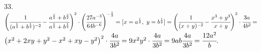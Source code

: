 33. $\left(\cfrac{1}{(a^\frac{1}{2}+b^\frac{1}{2})^{-2}}-\cfrac{a^\frac{3}{2}+
b^\frac{3}{2}}{a^\frac{1}{2}+
b^\frac{1}{2}}\right)^2\cdot\left(\cfrac{27a^{-3}}{64b^{-6}}\right)^{-\frac{1}{3}}=[x=a^\frac{1}{2},\ y=b^\frac{1}{2}]=
\left(\cfrac{1}{(x+y)^{-2}}-\cfrac{x^3+y^3}{x+y}\right)^2\cdot\cfrac{3a}{4b^2}=$\\$
\left(x^2+2xy+y^2-x^2+xy-y^2\right)^2\cdot\cfrac{4a}{3b^2}=
9x^2y^2\cdot\cfrac{4a}{3b^2}=9ab\cfrac{4a}{3b^2}=\cfrac{12a^2}{b}.$\\
